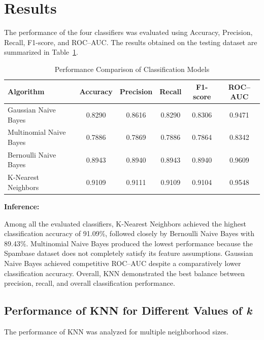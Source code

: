 \documentclass[12pt,a4paper]{article}
\begin{document}
	\section{Results}
	
	The performance of the four classifiers was evaluated using Accuracy, Precision, Recall, F1-score, and ROC--AUC. The results obtained on the testing dataset are summarized in Table~\ref{tab:performance}.
	
	\begin{table}[H]
		\centering
		\caption{Performance Comparison of Classification Models}
		\label{tab:performance}
		\begin{tabular}{lccccc}
			\toprule
			Algorithm & Accuracy & Precision & Recall & F1-score & ROC--AUC\\
			\midrule
			Gaussian Naive Bayes & 0.8290 & 0.8616 & 0.8290 & 0.8306 & 0.9471\\
			Multinomial Naive Bayes & 0.7886 & 0.7869 & 0.7886 & 0.7864 & 0.8342\\
			Bernoulli Naive Bayes & 0.8943 & 0.8940 & 0.8943 & 0.8940 & 0.9609\\
			K-Nearest Neighbors & 0.9109 & 0.9111 & 0.9109 & 0.9104 & 0.9548\\
			\bottomrule
		\end{tabular}
	\end{table}
	
	\textbf{Inference:}
	
	Among all the evaluated classifiers, K-Nearest Neighbors achieved the highest classification accuracy of 91.09\%, followed closely by Bernoulli Naive Bayes with 89.43\%. Multinomial Naive Bayes produced the lowest performance because the Spambase dataset does not completely satisfy its feature assumptions. Gaussian Naive Bayes achieved competitive ROC--AUC despite a comparatively lower classification accuracy. Overall, KNN demonstrated the best balance between precision, recall, and overall classification performance.
	
	\subsection{Performance of KNN for Different Values of \textit{k}}
	
	The performance of KNN was analyzed for multiple neighborhood sizes.
	
\end{document}
